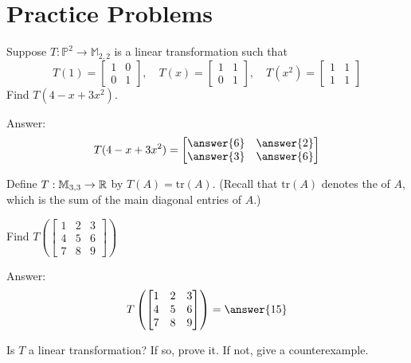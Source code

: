 \documentclass{ximera}
\begin{document}

\section*{Practice Problems}
\begin{problem}\label{prob:lintransP2toM22}
Suppose $T:\mathbb{P}^2\rightarrow\mathbb{M}_{2,2}$ is a linear transformation such that 
$$T(1)=\begin{bmatrix}1&0\\0&1\end{bmatrix},\quad T(x)=\begin{bmatrix}1&1\\0&1\end{bmatrix},\quad T(x^2)=\begin{bmatrix}1&1\\1&1\end{bmatrix}$$
Find $T(4-x+3x^2)$.

Answer:$$T(4-x+3x^2)=\begin{bmatrix}\answer{6}&\answer{2}\\\answer{3}&\answer{6}\end{bmatrix}$$

\end{problem}

\begin{problem}
Define $T:\mathbb{M}_{3,3}\rightarrow \mathbb{R}$ by $T(A)=\mbox{tr}(A)$.  (Recall that $\mbox{tr}(A)$ denotes the  of $A$, which is the sum of the main diagonal entries of $A$.)

\begin{problem}\label{prob:tracelintrans1}
Find $T\left(\begin{bmatrix}1&2&3\\4&5&6\\7&8&9\end{bmatrix}\right)$

Answer: $$T\left(\begin{bmatrix}1&2&3\\4&5&6\\7&8&9\end{bmatrix}\right)=\answer{15}$$
\end{problem}

\begin{problem}\label{prob:tracelintrans2}
Is $T$ a linear transformation?  If so, prove it.  If not, give a counterexample.
\end{problem}
\end{problem}
\end{document}
